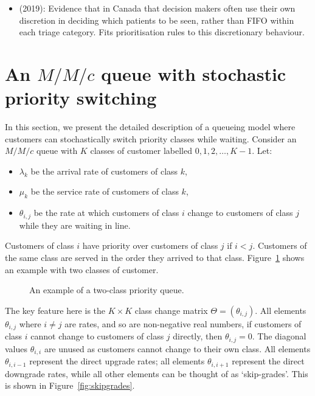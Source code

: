 \documentclass{article}
\begin{document}
\begin{itemize}
  \item \cite{ding19} (2019): Evidence that in Canada that decision makers
      often use their own discretion in deciding which patients to be seen,
        rather than FIFO within each triage category. Fits prioritisation rules
        to this discretionary behaviour.
\end{itemize}




\section{An $M/M/c$ queue with stochastic priority switching}\label{sec:system}
In this section, we present the detailed description of a queueing model where
customers can stochastically switch priority classes while waiting.
Consider an $M/M/c$ queue with $K$ classes of customer labelled
$0, 1, 2, \dots, K-1$. Let:

\begin{itemize}
  \item $\lambda_k$ be the arrival rate of customers of class $k$,
  \item $\mu_k$ be the service rate of customers of class $k$,
  \item $\theta_{i,j}$ be the rate at which customers of class $i$ change
  to customers of class $j$ while they are waiting in line.
\end{itemize}

Customers of class $i$ have priority over customers of class $j$ if $i < j$.
Customers of the same class are served in the order they arrived to that class.
Figure~\ref{fig:twoclass_example} shows an example with two classes of customer.

\begin{figure}
\begin{center}

\end{center}
\caption{An example of a two-class priority queue.}
\label{fig:twoclass_example}
\end{figure}

The key feature here is the $K \times K$ class change matrix
$\Theta = (\theta_{i,j})$. All elements $\theta_{i,j}$ where $i \neq j$ are
rates, and so are non-negative real numbers, if customers of class $i$ cannot
change to customers of class $j$ directly, then $\theta_{i,j} = 0$. The diagonal
values $\theta_{i,i}$ are unused as customers cannot change to their own class.
All elements $\theta_{i,i-1}$ represent the direct upgrade rates; all elements
$\theta_{i,i+1}$ represent the direct downgrade rates, while all other elements
can be thought of as `skip-grades'.
This is shown in Figure~\ref{fig:skipgrades}.
\end{document}
